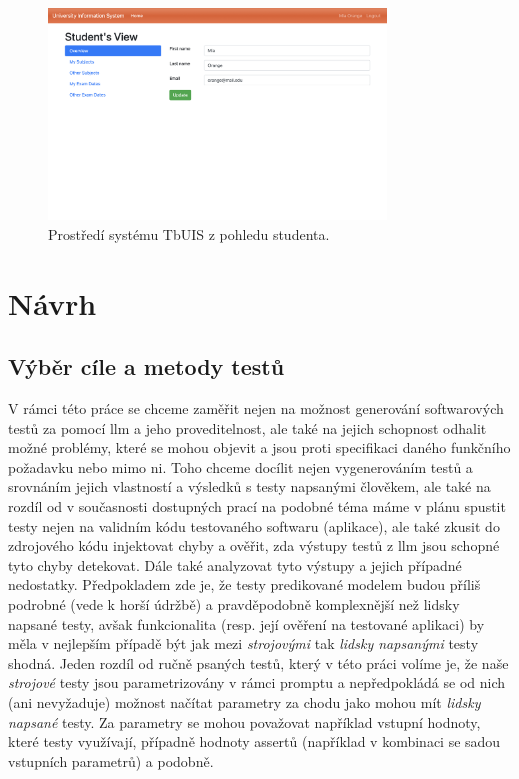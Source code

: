 \documentclass[czech, ma, kiv, he, iso690numb, pdf, viewonly]{fasthesis}
\begin{document}
    \begin{figure}
        \includegraphics[width=0.8\textwidth]{pic/tbuis.png}
        \centering
        \caption{Prostředí systému TbUIS z pohledu studenta.}
        \label{fig:tbuis}
    \end{figure}

\chapter{Návrh}

        \section{Výběr cíle a metody testů} \label{sec:goals}
        V rámci této práce se chceme zaměřit nejen na možnost generování softwarových testů za pomocí \Gls{llm} a jeho proveditelnost, ale také na jejich schopnost odhalit možné problémy, které se mohou objevit a jsou proti specifikaci daného funkčního požadavku nebo mimo ni. Toho chceme docílit nejen vygenerováním testů a srovnáním jejich vlastností a výsledků s testy napsanými člověkem, ale také na rozdíl od v současnosti dostupných prací na podobné téma máme v plánu spustit testy nejen na validním kódu testovaného softwaru (aplikace), ale také zkusit do zdrojového kódu injektovat chyby a ověřit, zda výstupy testů z \Gls{llm} jsou schopné tyto chyby detekovat. Dále také analyzovat tyto výstupy a jejich případné nedostatky. Předpokladem zde je, že testy predikované modelem budou příliš podrobné (vede k horší údržbě) a pravděpodobně komplexnější než lidsky napsané testy, avšak funkcionalita (resp. její ověření na testované aplikaci) by měla v nejlepším případě být jak mezi \textit{strojovými} tak \textit{lidsky napsanými} testy shodná. Jeden rozdíl od ručně psaných testů, který v této práci volíme je, že naše \textit{strojové} testy jsou parametrizovány v rámci promptu a nepředpokládá se od nich (ani nevyžaduje) možnost načítat parametry za chodu jako mohou mít \textit{lidsky napsané} testy. Za parametry se mohou považovat například vstupní hodnoty, které testy využívají, případně hodnoty assertů (například v kombinaci se sadou vstupních parametrů) a podobně.
\end{document}
